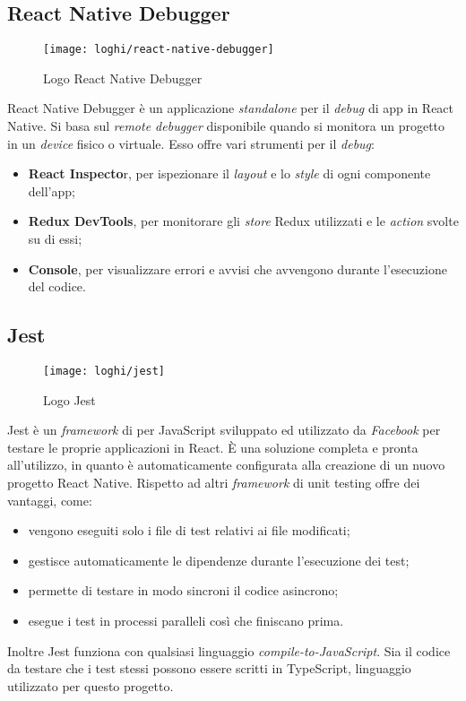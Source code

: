 \subsection{React Native Debugger}
\begin{figure}[H] 
	\centering
	\texttt{[image: loghi/react-native-debugger]}
	\caption{Logo React Native Debugger}
\end{figure}
React Native Debugger è un applicazione \emph{standalone} per il \emph{debug} di app in React 
Native. Si basa sul \emph{remote debugger} disponibile quando si monitora un
progetto in un \emph{device} fisico o virtuale.
\newpage
Esso offre vari strumenti per il \emph{debug}:
\begin{itemize}
	\item \textbf{React Inspecto}r, per ispezionare il \emph{layout} e lo \emph{style} di ogni componente dell'app;
	\item \textbf{Redux DevTools}, per monitorare gli \emph{store} Redux utilizzati e le \emph{action} svolte su di essi;
	\item \textbf{Console}, per visualizzare errori e avvisi che avvengono durante l'esecuzione del codice.
\end{itemize}

\subsection{Jest} \label{subsez:jest}
\begin{figure}[H] 
	\centering
	\texttt{[image: loghi/jest]}
	\caption{Logo Jest}
\end{figure}
Jest è un \emph{framework }di  per JavaScript
sviluppato ed utilizzato da \emph{Facebook} per testare le proprie applicazioni
in React. È una soluzione completa e pronta all'utilizzo, in quanto è
automaticamente configurata alla creazione di un nuovo progetto React Native.
Rispetto ad altri \emph{framework} di unit testing offre dei vantaggi, come: 
\begin{itemize}
	\item vengono eseguiti solo i file di test relativi ai file modificati;
	\item gestisce automaticamente le dipendenze durante l'esecuzione dei test;
	\item permette di testare in modo sincroni il codice asincrono;
	\item esegue i test in processi paralleli così che finiscano prima.
\end{itemize}
Inoltre Jest funziona con qualsiasi linguaggio \emph{compile-to-JavaScript}. 
Sia il codice da testare che i test stessi possono essere scritti in TypeScript, 
linguaggio utilizzato per questo progetto. 
